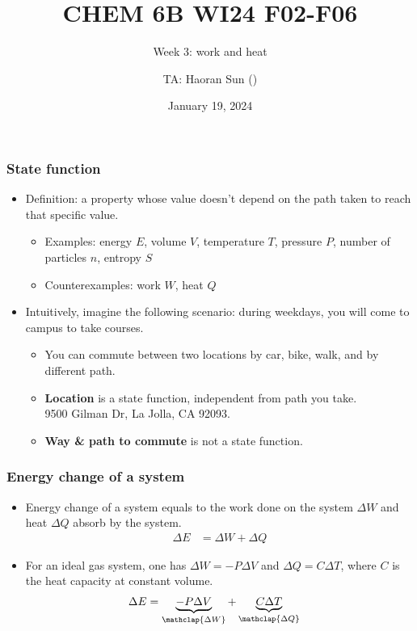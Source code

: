 \documentclass[aspectratio=169,xcolor={dvipsnames}]{beamer}
\title{CHEM 6B WI24 F02-F06}
\subtitle{Week 3: work and heat}
\author{TA: Haoran Sun (\href{mailto:\mail}{\mail})}
\institute{University of California, San Diego}
\date{January 19, 2024}
\begin{document}
\maketitle


\begin{frame}[t]
    \frametitle{State function}
    \begin{itemize}
        \item Definition: a property whose value doesn't depend on the path taken 
            to reach that specific value.
            \begin{itemize}
                \item Examples: energy $E$, volume $V$, temperature $T$, pressure $P$,
                    number of particles $n$, {\color{gray} entropy $S$}
                \item Counterexamples: work $W$, heat $Q$
            \end{itemize}

        \item<2> Intuitively, imagine the following scenario: during weekdays, 
            you will come to campus to take courses.
            \begin{itemize}
                \item You can commute between two locations by car, bike, walk,
                    and by different path. 
                \item \textbf{Location} is a state function, independent from path you take.\\
                    9500 Gilman Dr, La Jolla, CA 92093.
                \item \textbf{Way \& path to commute} is not a state function.
            \end{itemize}
    \end{itemize}
\end{frame}

\begin{frame}[t]
    \frametitle{Energy change of a system}
    \begin{itemize}
        \item Energy change of a system equals to 
            the work done on the system $\Delta W$ and heat $\Delta Q$ absorb
            by the system.
            \begin{align}
                \Delta E &= \Delta W + \Delta Q
            \end{align}
        \item For an ideal gas system, one has $\Delta W = -P\Delta V$
            and $\Delta Q = C\Delta T$, where $C$ is the heat capacity 
            {\color{gray} at constant volume.}
            \begin{align}
                \Delta E &= \underbrace{-P\Delta V}_{\mathclap{\Delta W}} + 
                    \underbrace{C\Delta T}_{\mathclap{\Delta Q}}
            \end{align}
    \end{itemize}
\end{frame}
\end{document}
